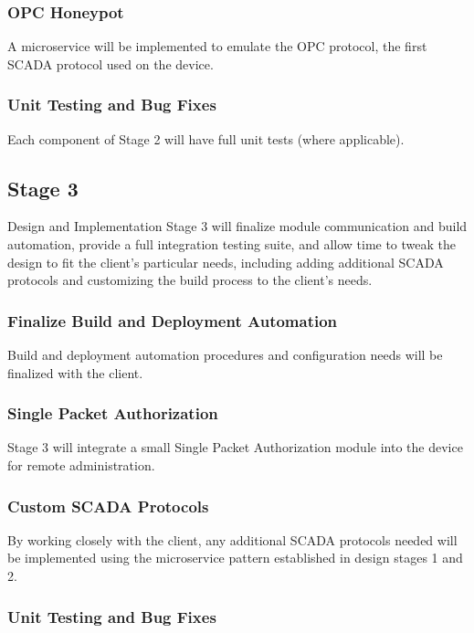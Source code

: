 \subsubsection{OPC Honeypot}

A microservice will be implemented to emulate the OPC protocol, the first
SCADA protocol used on the device.

\subsubsection{Unit Testing and Bug Fixes}

Each component of Stage 2 will have full unit tests (where applicable).


\subsection{Stage 3}

Design and Implementation Stage 3 will finalize module communication and
build automation, provide a full integration testing suite, and allow time
to tweak the design to fit the client's particular needs, including adding
additional SCADA protocols and customizing the build process to the client's
needs.

\subsubsection{Finalize Build and Deployment Automation}

Build and deployment automation procedures and configuration needs will be
finalized with the client.

\subsubsection{Single Packet Authorization}

Stage 3 will integrate a small Single Packet Authorization module into the
device for remote administration.

\subsubsection{Custom SCADA Protocols}

By working closely with the client, any additional SCADA protocols needed will
be implemented using the microservice pattern established in design stages 1
and 2.

\subsubsection{Unit Testing and Bug Fixes}

